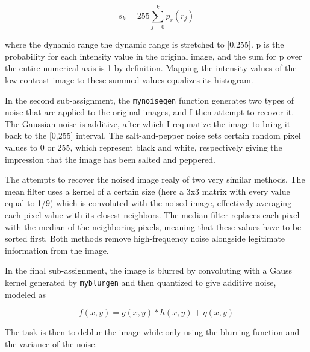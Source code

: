 \documentclass[a4paper]{article}
\begin{document}
\begin{equation}
	s_k = 255 \sum_{j=0}^{k} p_r(r_j)
\end{equation}

where the dynamic range the dynamic range is stretched to [0,255]. p is the probability for each intensity value in the original image, and the sum for p over the entire numerical axis is 1 by definition. Mapping the intensity values of the low-contrast image to these summed values equalizes its histogram.

In the second sub-assignment, the \texttt{mynoisegen} function generates two types of noise that are applied to the original images, and I then attempt to recover it. The Gaussian noise is additive, after which I requnatize the image to bring it back to the [0,255] interval. The salt-and-pepper noise sets certain random pixel values to 0 or 255, which represent black and white, respectively giving the impression that the image has been salted and peppered.

The attempts to recover the noised image realy of two very similar methods. The mean filter uses a kernel of a certain size (here a 3x3 matrix with every value equal to 1/9) which is convoluted with the noised image, effectively averaging each pixel value with its closest neighbors. The median filter replaces each pixel with the median of the neighboring pixels, meaning that these values have to be sorted first. Both methods remove high-frequency noise alongside legitimate information from the image.

In the final sub-assignment, the image is blurred by convoluting with a Gauss kernel generated by \texttt{myblurgen} and then quantized to give additive noise, modeled as

\begin{equation}
	f(x,y) = g(x,y) * h(x,y) + \eta(x,y)
\end{equation}

The task is then to deblur the image while only using the blurring function and the variance of the noise.


\end{document}
